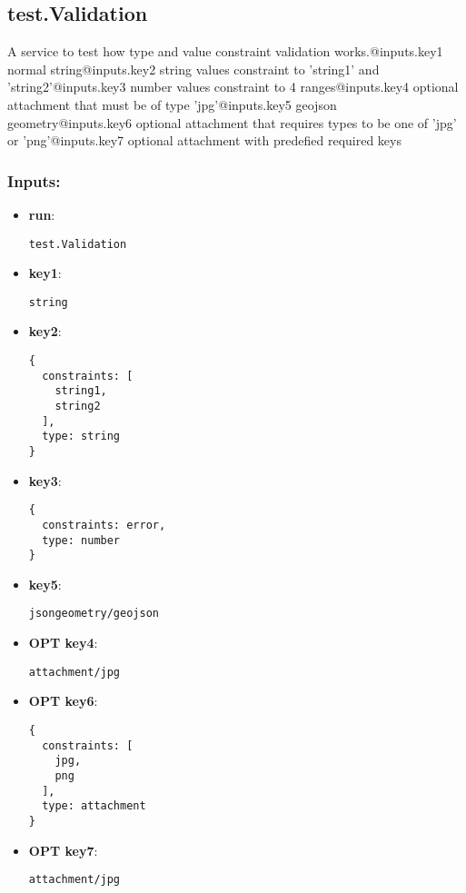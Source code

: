 \subsection{test.Validation}
\label{ch:builtinservices:test.Validation}
A
 service to test how type and value constraint validation 
works.@inputs.key1 normal string@inputs.key2 string values constraint to
 'string1' and 'string2'@inputs.key3 number values constraint to 4 
ranges@inputs.key4 optional attachment that must be of type 
'jpg'@inputs.key5 geojson geometry@inputs.key6 optional attachment that 
requires types to be one of 'jpg' or 'png'@inputs.key7 optional 
attachment with predefied required keys
\subsubsection*{Inputs:}
\begin{itemize}
    \item \textbf{run}: 
\begin{lstlisting}
test.Validation
\end{lstlisting}
    \item \textbf{key1}: 
\begin{lstlisting}
string
\end{lstlisting}
    \item \textbf{key2}: 
\begin{lstlisting}
{
  constraints: [
    string1, 
    string2
  ], 
  type: string
}
\end{lstlisting}
    \item \textbf{key3}: 
\begin{lstlisting}
{
  constraints: error, 
  type: number
}
\end{lstlisting}
    \item \textbf{key5}: 
\begin{lstlisting}
jsongeometry/geojson
\end{lstlisting}
    \item \textbf{OPT key4}: 
\begin{lstlisting}
attachment/jpg
\end{lstlisting}
    \item \textbf{OPT key6}: 
\begin{lstlisting}
{
  constraints: [
    jpg, 
    png
  ], 
  type: attachment
}
\end{lstlisting}
    \item \textbf{OPT key7}: 
\begin{lstlisting}
attachment/jpg
\end{lstlisting}
  \end{itemize}


